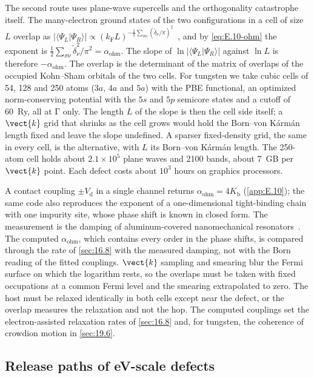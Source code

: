 The second route uses plane-wave supercells and the orthogonality catastrophe itself. The many-electron ground states of the two configurations in a cell of size $L$ overlap as $|\langle\Psi_L|\Psi_R\rangle| \propto (k_{\mathrm{F}}L)^{-\frac12\sum_{\sigma\nu}(\tilde\delta_\nu/\pi)^2}$~\cite{anderson1967infrared}, and by \cref{eq:E.10-ohm} the exponent is $\tfrac12\sum_{\sigma\nu}\tilde\delta_\nu^2/\pi^2 = \alpha_{\mathrm{ohm}}$. The slope of $\ln|\langle\Psi_L|\Psi_R\rangle|$ against $\ln L$ is therefore $-\alpha_{\mathrm{ohm}}$. The overlap is the determinant of the matrix of overlaps of the occupied Kohn--Sham orbitals of the two cells. For tungsten we take cubic cells of 54, 128 and 250 atoms ($3a$, $4a$ and $5a$) with the PBE functional, an optimized norm-conserving potential with the $5s$ and $5p$ semicore states and a cutoff of \SI{60}{Ry}, all at $\mathrm{\Gamma}$ only. The length $L$ of the slope is then the cell side itself; a $\vect{k}$ grid that shrinks as the cell grows would hold the Born--von K\'arm\'an length fixed and leave the slope undefined. A sparser fixed-density grid, the same in every cell, is the alternative, with $L$ its Born--von K\'arm\'an length. The 250-atom cell holds about $2.1\times10^5$ plane waves and 2100 bands, about \SI{7}{GB} per $\vect{k}$ point. Each defect costs about $10^3$ hours on graphics processors.

A contact coupling $\pm V_{\mathrm{d}}$ in a single channel returns $\alpha_{\mathrm{ohm}} = 4K_{\mathrm{b}}$ (\cref{app:E.10}); the same code also reproduces the exponent of a one-dimensional tight-binding chain with one impurity site, whose phase shift is known in closed form. The measurement is the damping of aluminum-covered nanomechanical resonators~\cite{maillet2023nanomechanical}. The computed $\alpha_{\mathrm{ohm}}$, which contains every order in the phase shifts, is compared through the rate of \cref{sec:16.8} with the measured damping, not with the Born reading of the fitted couplings. $\vect{k}$ sampling and smearing blur the Fermi surface on which the logarithm rests, so the overlaps must be taken with fixed occupations at a common Fermi level and the smearing extrapolated to zero. The host must be relaxed identically in both cells except near the defect, or the overlap measures the relaxation and not the hop. The computed couplings set the electron-assisted relaxation rates of \cref{sec:16.8} and, for tungsten, the coherence of crowdion motion in \cref{sec:19.6}.

\subsection{Release paths of eV-scale defects}

